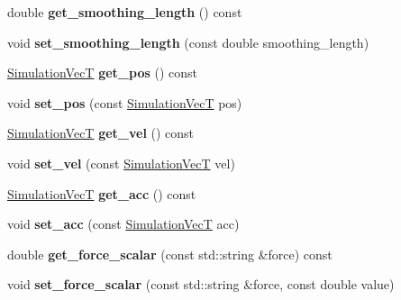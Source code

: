\begin{DoxyCompactItemize}
double {\bfseries get\+\_\+smoothing\+\_\+length} () const
\item 
\mbox{\label{classwash_1_1Particle_a15892a4346c05de955f91087dc88786d}} 
void {\bfseries set\+\_\+smoothing\+\_\+length} (const double smoothing\+\_\+length)
\item 
\mbox{\label{classwash_1_1Particle_a9d222d453d640cf629ee8dfbee6b43c2}} 
\mbox{\hyperlink{classwash_1_1Vec}{Simulation\+VecT}} {\bfseries get\+\_\+pos} () const
\item 
\mbox{\label{classwash_1_1Particle_af06835533935c04e594c258a7dcdd1ef}} 
void {\bfseries set\+\_\+pos} (const \mbox{\hyperlink{classwash_1_1Vec}{Simulation\+VecT}} pos)
\item 
\mbox{\label{classwash_1_1Particle_a890d0f1467225393e385872b0c98b974}} 
\mbox{\hyperlink{classwash_1_1Vec}{Simulation\+VecT}} {\bfseries get\+\_\+vel} () const
\item 
\mbox{\label{classwash_1_1Particle_a4755365883cfd62117ebe74fe44d35e0}} 
void {\bfseries set\+\_\+vel} (const \mbox{\hyperlink{classwash_1_1Vec}{Simulation\+VecT}} vel)
\item 
\mbox{\label{classwash_1_1Particle_afb8c9dce2692cdfab61a3a87fde50610}} 
\mbox{\hyperlink{classwash_1_1Vec}{Simulation\+VecT}} {\bfseries get\+\_\+acc} () const
\item 
\mbox{\label{classwash_1_1Particle_a395e095de0b2af7dfc925bedef2090a1}} 
void {\bfseries set\+\_\+acc} (const \mbox{\hyperlink{classwash_1_1Vec}{Simulation\+VecT}} acc)
\item 
\mbox{\label{classwash_1_1Particle_ab42a162b41a4e8cf6212bd9c43f3a0cf}} 
double {\bfseries get\+\_\+force\+\_\+scalar} (const std\+::string \&force) const
\item 
\mbox{\label{classwash_1_1Particle_a2c3038c8eac34e371922bcf1ab79b8ca}} 
void {\bfseries set\+\_\+force\+\_\+scalar} (const std\+::string \&force, const double value)
\item 

\end{DoxyCompactItemize}
